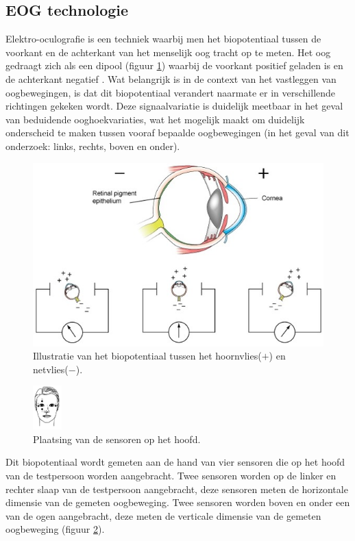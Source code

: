 \documentclass{article}
\begin{document}
\subsection{EOG technologie}
Elektro-oculografie is een techniek waarbij men het biopotentiaal tussen de voorkant en de achterkant van het menselijk oog tracht  op te meten.  Het oog gedraagt zich als een dipool (figuur \ref{fig:oogdipool}) waarbij de voorkant positief geladen is en de achterkant negatief \cite{yagi:eoginterface}. Wat belangrijk is in de context van het vastleggen van oogbewegingen, is dat dit biopotentiaal verandert naarmate er in verschillende richtingen gekeken wordt. Deze signaalvariatie is duidelijk meetbaar in het geval van beduidende ooghoekvariaties, wat het mogelijk maakt om duidelijk onderscheid te maken tussen vooraf bepaalde oogbewegingen (in het geval van dit onderzoek: links, rechts, boven en onder).
\begin{figure}[H]
	\centering
	\includegraphics[width=0.8\linewidth]{images/oogdipool}
	\caption{Illustratie van het biopotentiaal tussen het hoornvlies($+$) en netvlies($-$).}
	\label{fig:oogdipool}
\end{figure}
\begin{figure}
	\begin{center}
		\includegraphics[width=0.1\textwidth]{images/sensorplaatsing}
		\caption{Plaatsing van de sensoren op het hoofd.}
		\label{fig:sensorplaatsing}
	\end{center}
\end{figure}
Dit biopotentiaal wordt gemeten aan de hand van vier sensoren die op het hoofd van de testpersoon worden aangebracht. Twee sensoren worden op de linker en rechter slaap van de testpersoon aangebracht, deze sensoren meten de horizontale dimensie van de gemeten oogbeweging. Twee sensoren worden boven en onder een van de ogen aangebracht, deze meten de verticale dimensie van de gemeten oogbeweging (figuur \ref{fig:sensorplaatsing}).\\
\end{document}
